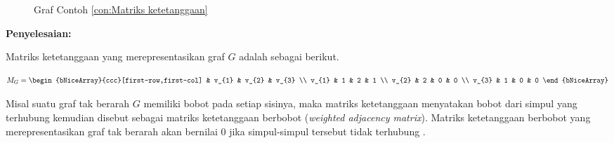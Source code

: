 {{{\begin{contoh}
                \begin{figure}\label{gam:Contoh Matriks Ketetanggaan}
                    \centering
                    \vspace{-7mm}
                    \caption{Graf Contoh \ref{con:Matriks ketetanggaan}}
                \end{figure}

                \noindent
                \textbf{Penyelesaian:}

                {\noindent
                    Matriks ketetanggaan yang merepresentasikan graf $G$ adalah sebagai berikut.

                    \begin{equation*}
                        M_{G} =
                        \begin{bNiceArray}{ccc}[first-row,first-col]
                            & v_{1} & v_{2} & v_{3} \\
                            v_{1} & 1     & 2     & 1     \\
                            v_{2} & 2     & 0     & 0     \\
                            v_{3} & 1     & 0     & 0
                        \end{bNiceArray}
                    \end{equation*}
                }
            \end{contoh}

            Misal suatu graf tak berarah $G$ memiliki bobot pada setiap sisinya, maka matriks ketetanggaan menyatakan bobot dari simpul yang terhubung kemudian
            disebut sebagai matriks ketetanggaan berbobot (\textit{weighted adjacency matrix}). Matriks ketetanggaan berbobot yang merepresentasikan graf tak berarah
            akan bernilai $0$ jika simpul-simpul tersebut tidak terhubung .

}}}
